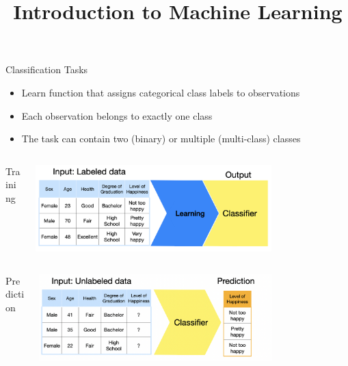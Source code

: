 \documentclass[11pt,compress,t,notes=noshow, xcolor=table]{beamer}
\title{Introduction to Machine Learning}
\date{}
\begin{document}
\sloppy

\begin{vbframe}{Classification Tasks}
\begin{itemize}
\item \small Learn function that assigns categorical class labels to observations
\item \small Each observation belongs to exactly one class
\item \small The task can contain two (binary) or multiple (multi-class) classes
\end{itemize}


\begin{columns}  
\begin{column}{0.1\textwidth} 
\begin{center}
Training
\end{center}
\end{column}
\begin{column}{0.9\textwidth} 
\begin{center}
  \includegraphics[width = 0.75\textwidth]{slides/supervised-classification/figure_man/nutshell-classification-training-task.png}
\end{center}
\end{column}
\end{columns}
\begin{columns}
\begin{column}{0.1\textwidth} 
\begin{center}
Prediction
\end{center}
\end{column}
\begin{column}{0.9\textwidth} 
\begin{center}
  \includegraphics[width = 0.75\textwidth]{slides/supervised-classification/figure_man/nutshell-classification-prediction-task.png} 
\end{center}
\end{column}
\end{columns}
\end{vbframe}
\end{document}
